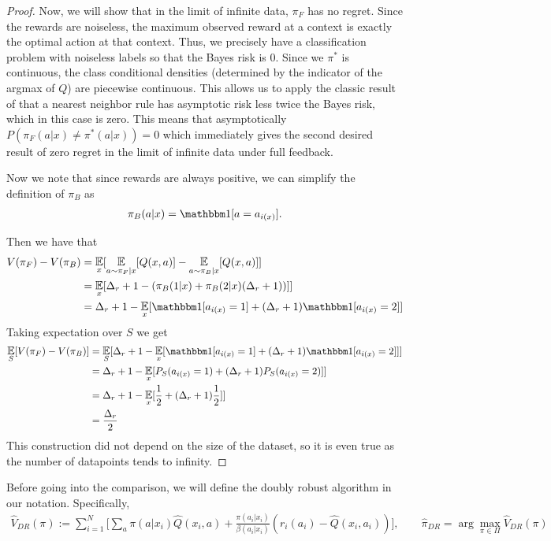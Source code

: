 \begin{subappendices}
\begin{proof}
Now, we will show that in the limit of infinite data, $ \pi_F$ has no regret. Since the rewards are noiseless, the maximum observed reward at a context is exactly the optimal action at that context. Thus, we precisely have a classification problem with noiseless labels so that the Bayes risk is 0.
Since we $\pi^*$ is continuous, the class conditional densities (determined by the indicator of the argmax of $ Q$) are piecewise continuous.
This allows us to apply the classic result of \cite{cover1967} that a nearest neighbor rule has asymptotic risk less twice the Bayes risk, which in this case is zero. This means that asymptotically $ P(\pi_F(a|x) \neq \pi^*(a|x)) = 0$ which immediately gives the second desired result of zero regret in the limit of infinite data under full feedback.

Now we note that since rewards are always positive, we can simplify the definition of $ \pi_B$ as
\begin{align}
    \pi_{B}(a|x) = \one[a = a_{i(x)}].
\end{align}

Then we have that
\begin{align}
    V(\pi_F) - V(\pi_{B}) &= \E_x [\E_{a\sim \pi_F|x}[Q(x,a)] - \E_{a\sim \pi_{B}|x}[Q(x,a)] ]\\
    &= \E_x [\Delta_r + 1 - (\pi_{B}(1|x) + \pi_{B}(2|x) (\Delta_r + 1))] ] \\
    &= \Delta_r + 1 - \E_x[\one[a_{i(x)} = 1] + (\Delta_r + 1)\one[a_{i(x)} = 2]]
\end{align}
Taking expectation over $ S$ we get
\begin{align}
    \E_S[V(\pi_F) - V(\pi_{B})] &= \E_S[\Delta_r + 1 - \E_x[\one[a_{i(x)} = 1] + (\Delta_r + 1)\one[a_{i(x)} = 2]]]\\
    &= \Delta_r + 1 - \E_x[P_S(a_{i(x)} = 1) + (\Delta_r + 1)P_S(a_{i(x)} = 2)]]\\
    &= \Delta_r + 1 - \E_x[\frac{1}{2} + (\Delta_r + 1)\frac{1}{2}]]\\
    &= \frac{\Delta_r}{2}
\end{align}
This construction did not depend on the size of the dataset, so it is even true as the number of datapoints tends to infinity.
\end{proof}



\label{app:dr}


Before going into the comparison, we will define the doubly robust algorithm \cite{dudik2011doubly} in our notation. Specifically,
\begin{align}\label{eq:dr}
    \widehat V_{DR} (\pi) := \sum_{i=1}^N \bigg[ \sum_a \pi(a|x_i) \hat Q(x_i, a) + \frac{\pi(a_i|x_i)}{\beta(a_i|x_i)} (r_i(a_i) - \hat Q(x_i, a_i)) \bigg], \qquad \hat \pi_{DR} = \arg\max_{\pi \in \Pi} \widehat V_{DR}(\pi)
\end{align}


\end{subappendices}
